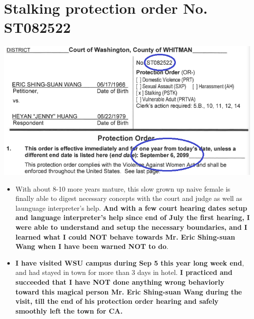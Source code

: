 \documentclass[9pt, b5paper]{article}
\begin{document}
\section{Stalking protection order No. ST082522}
\label{sec-6}

\includegraphics[width=.9\linewidth]{./pic/dearCousin_20220919_222725.png}
\begin{itemize}
\item With about 8-10 more years mature, this slow grown up naive female is finally able to digest necessary concepts with the court and judge as well as launguage interpreter's help. \textbf{And with a few court hearing dates setup and language interpreter's help since end of July the first hearing, I were able to understand and setup the necessary boundaries, and I learned what I could NOT behave towards Mr. Eric Shing-suan Wang when I have been warned NOT to do}.
\item \textbf{I have visited WSU campus during Sep 5 this year long week end}, and had stayed in town for more than 3 days in hotel. \textbf{I practiced and succeeded that I have NOT done anything wrong behaviorly toward this magical person Mr. Eric Shing-suan Wang during the visit, till the end of his protection order hearing and safely smoothly left the town for CA.}
\end{itemize}
\end{document}
